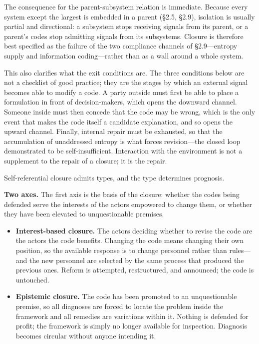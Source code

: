 \documentclass[11pt,a4paper]{article}
\begin{document}
The consequence for the parent-subsystem relation is immediate. Because every system except the largest is embedded in a parent (\S2.5, \S2.9), isolation is usually partial and directional: a subsystem stops receiving signals from its parent, or a parent's codes stop admitting signals from its subsystems. Closure is therefore best specified as the failure of the two compliance channels of \S2.9---entropy supply and information coding---rather than as a wall around a whole system.

This also clarifies what the exit conditions are. The three conditions below are not a checklist of good practice; they are the stages by which an external signal becomes able to modify a code. A party outside must first be able to place a formulation in front of decision-makers, which opens the downward channel. Someone inside must then concede that the code may be wrong, which is the only event that makes the code itself a candidate explanation, and so opens the upward channel. Finally, internal repair must be exhausted, so that the accumulation of unaddressed entropy is what forces revision---the closed loop demonstrated to be self-insufficient. Interaction with the environment is not a supplement to the repair of a closure; it is the repair.

Self-referential closure admits types, and the type determines prognosis.

\textbf{Two axes.} The first axis is the basis of the closure: whether the codes being defended serve the interests of the actors empowered to change them, or whether they have been elevated to unquestionable premises.

\begin{itemize}
    \item \textbf{Interest-based closure.} The actors deciding whether to revise the code are the actors the code benefits. Changing the code means changing their own position, so the available response is to change personnel rather than rules---and the new personnel are selected by the same process that produced the previous ones. Reform is attempted, restructured, and announced; the code is untouched.
    \item \textbf{Epistemic closure.} The code has been promoted to an unquestionable premise, so all diagnoses are forced to locate the problem inside the framework and all remedies are variations within it. Nothing is defended for profit; the framework is simply no longer available for inspection. Diagnosis becomes circular without anyone intending it.
\end{itemize}
\end{document}
